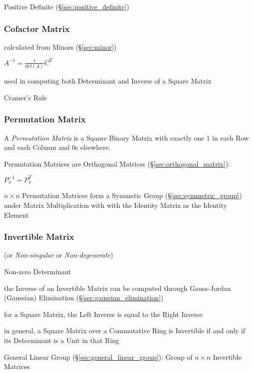 Positive Definite (\S\ref{sec:positive_definite})



\subsubsection{Cofactor Matrix}\label{sec:cofactor_matrix}

calculated from Minors (\S\ref{sec:minor})

$A^{-1} = \frac{1}{det(A)}C^T$

used in computing both Determinant and Inverse of a Square Matrix

Cramer's Rule



\subsubsection{Permutation Matrix}\label{sec:permutation_matrix}

A \emph{Permutation Matrix} is a Square Binary Matrix with exactly one
$1$ in each Row and each Column and $0$s elsewhere.

Permutation Matrices are Orthogonal Matrices (\S\ref{sec:orthogonal_matrix}):

$P_\pi^{-1} = P_\pi^T$

$n \times n$ Permutation Matrices form a Symmetic Group
(\S\ref{sec:symmetric_group}) under Matrix Multiplication with
with the Identity Matrix as the Identity Element



\subsubsection{Invertible Matrix}\label{sec:invertible_matrix}

(or \emph{Non-singular} or \emph{Non-degenerate})

Non-zero Determinant

\fist the Inverse of an Invertible Matrix can be computed through Gauss-Jordan
(Gaussian) Elimination (\S\ref{sec:gaussian_elimination})

for a Square Matrix, the Left Inverse is equal to the Right Inverse

in general, a Square Matrix over a Commutative Ring is Invertible if and only
if its Determinant is a Unit in that Ring

\fist General Linear Group (\S\ref{sec:general_linear_group}): Group of $n
\times n$ Invertible Matrices

